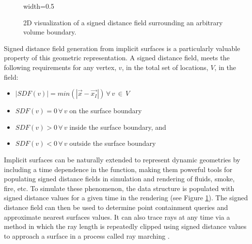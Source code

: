 \begin{figure}[H]
  {width=0.5\textwidth}
  \centering
  \caption[2D depiction of a signed distance field.]{2D visualization of a signed distance field surrounding an arbitrary volume boundary.}
  \label{fig:preconditioner_datastruct}
\end{figure}





Signed distance field generation from implicit surfaces is a particularly
valuable property of this geometric representation. A signed distance field,
meets the following requirements for any vertex, $v$, in the
total set of locations, $V$, in the field:

\begin{itemize}
\item $ |SDF(v)| = min(|\vec{x}-\vec{x_I}|) \, \forall \, v \, \in \, V$
\item $ SDF(v) = 0 \, \forall \, v$ on the surface boundary
\item $ SDF(v) > 0 \, \forall \, v$ inside the surface boundary, and
\item $ SDF(v) < 0 \, \forall \, v$ outside the surface boundary
\end{itemize}

Implicit surfaces can be naturally extended to represent dynamic geometries by
including a time dependence in the function, making them powerful tools for
populating signed distance fields in simulation and rendering of fluids, smoke,
fire, etc. To simulate these phenomenon, the data structure is populated with
signed distance values for a given time in the rendering (see Figure
\ref{fig:preconditioner_datastruct}). The signed distance field can then be used
to determine point containment queries and approximate nearest surfaces
values. It can also trace rays at any time via a method in which the ray length
is repeatedly clipped using signed distance values to approach a surface in a
process called ray marching \cite{Tomczak_2012}.

